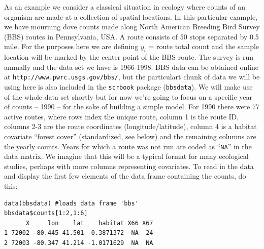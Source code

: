 As an example we consider a classical situation in ecology where
counts of an organism are made at a collection of spatial
locations. In this particular example, we have mourning dove counts
made along North American Breeding Bird Survey (BBS) routes in
Pennsylvania, USA. A route consists of 50 stops separated by 0.5
mile. For the purposes here we are defining $y_i$ = route total count
and the sample location will be marked by the center point of the BBS
route.  The survey is run annually and the data set we have is
1966-1998. BBS data can be obtained online at \mbox{\tt http:\//\//www.pwrc.usgs.gov\//bbs\//}, but the particulart chunk of data we will be using here is also included in the {\tt scrbook} package ({\tt bbsdata}).
We will make use of the whole data set shortly but for now we're going
to focus on a specific year of counts -- 1990 -- for the sake of
building a simple model.
 For 1990 there were 77 active routes, where rows index the unique route, column 1 is the
route ID, columns 2-3 are the route coordinates (longitude/latitude),
column 4 is a habitat covariate ``forest cover'' (standardized, see
below) and the remaining columns are the yearly counts. Years for
which a route was not run are coded as ``\mbox{\tt NA}'' in the data matrix. We
imagine that this will be a typical format for many ecological
studies, perhaps with more columns representing covariates.  To read
in the data and display the first few elements of the data frame containing the counts, do
this:
{\small
\begin{verbatim}
data(bbsdata) #loads data frame 'bbs'
bbsdata$counts[1:2,1:6]
      X     lon    lat    habitat X66 X67
1 72002 -80.445 41.501 -0.3871372  NA  24
2 72003 -80.347 41.214 -1.0171629  NA  NA
\end{verbatim}
}

